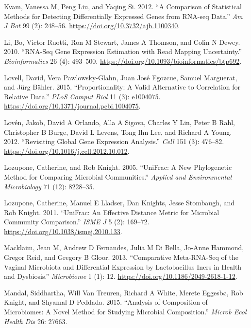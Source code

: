 \documentclass[onecolumn]{article}
\begin{document}
\leavevmode\hypertarget{ref-Kvam:2012}{}%
Kvam, Vanessa M, Peng Liu, and Yaqing Si. 2012. ``A Comparison of Statistical Methods for Detecting Differentially Expressed Genes from RNA-seq Data.'' \emph{Am J Bot} 99 (2): 248--56. \url{https://doi.org/10.3732/ajb.1100340}.

\leavevmode\hypertarget{ref-Li:2010aa}{}%
Li, Bo, Victor Ruotti, Ron M Stewart, James A Thomson, and Colin N Dewey. 2010. ``RNA-Seq Gene Expression Estimation with Read Mapping Uncertainty.'' \emph{Bioinformatics} 26 (4): 493--500. \url{https://doi.org/10.1093/bioinformatics/btp692}.

\leavevmode\hypertarget{ref-Lovell:2015}{}%
Lovell, David, Vera Pawlowsky-Glahn, Juan José Egozcue, Samuel Marguerat, and Jürg Bähler. 2015. ``Proportionality: A Valid Alternative to Correlation for Relative Data.'' \emph{PLoS Comput Biol} 11 (3): e1004075. \url{https://doi.org/10.1371/journal.pcbi.1004075}.

\leavevmode\hypertarget{ref-Loven:2012aa}{}%
Lovén, Jakob, David A Orlando, Alla A Sigova, Charles Y Lin, Peter B Rahl, Christopher B Burge, David L Levens, Tong Ihn Lee, and Richard A Young. 2012. ``Revisiting Global Gene Expression Analysis.'' \emph{Cell} 151 (3): 476--82. \url{https://doi.org/10.1016/j.cell.2012.10.012}.

\leavevmode\hypertarget{ref-unifrac:2005}{}%
Lozupone, Catherine, and Rob Knight. 2005. ``UniFrac: A New Phylogenetic Method for Comparing Microbial Communities.'' \emph{Applied and Environmental Microbiology} 71 (12): 8228--35.

\leavevmode\hypertarget{ref-Lozupone:2011aa}{}%
Lozupone, Catherine, Manuel E Lladser, Dan Knights, Jesse Stombaugh, and Rob Knight. 2011. ``UniFrac: An Effective Distance Metric for Microbial Community Comparison.'' \emph{ISME J} 5 (2): 169--72. \url{https://doi.org/10.1038/ismej.2010.133}.

\leavevmode\hypertarget{ref-macklaim:2013}{}%
Macklaim, Jean M, Andrew D Fernandes, Julia M Di Bella, Jo-Anne Hammond, Gregor Reid, and Gregory B Gloor. 2013. ``Comparative Meta-RNA-Seq of the Vaginal Microbiota and Differential Expression by Lactobacillus Iners in Health and Dysbiosis.'' \emph{Microbiome} 1 (1): 12. \url{https://doi.org/10.1186/2049-2618-1-12}.

\leavevmode\hypertarget{ref-ancom:2015}{}%
Mandal, Siddhartha, Will Van Treuren, Richard A White, Merete Eggesbø, Rob Knight, and Shyamal D Peddada. 2015. ``Analysis of Composition of Microbiomes: A Novel Method for Studying Microbial Composition.'' \emph{Microb Ecol Health Dis} 26: 27663.
\end{document}
